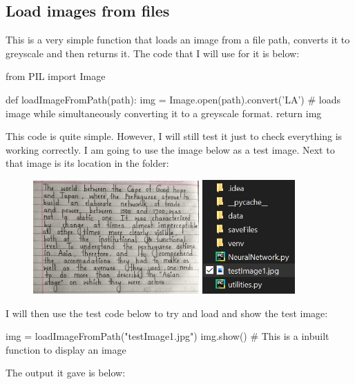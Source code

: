 \documentclass{report}
\begin{document}
\subsection{Load images from files}
This is a very simple function that loads an image from a file path, converts it to greyscale and then returns it. The code that I will use for it is below:
\begin{python}
from PIL import Image

def loadImageFromPath(path):
    img = Image.open(path).convert('LA')  # loads image while simultaneously converting it to a greyscale format.
    return img
\end{python}
This code is quite simple. However, I will still test it just to check everything is working correctly. I am going to use the image below as a test image. Next to that image is its location in the folder:
\begin{figure}[H]
    \centering
    \includegraphics[width = 2.5in]{Images/Development and Testing/Stage 4/Testing for load image from path/testImage1.jpg} 
    \includegraphics[height = 1.72in]{Images/Development and Testing/Stage 4/Testing for load image from path/ProofOfTestImage.png}
    \label{fig:Test Image}
\end{figure}
\noindent I will then use the test code below to try and load and show the test image:
\begin{python}
img = loadImageFromPath("testImage1.jpg")
img.show()  # This is a inbuilt function to display an image
\end{python}
The output it gave is below:
\end{document}
